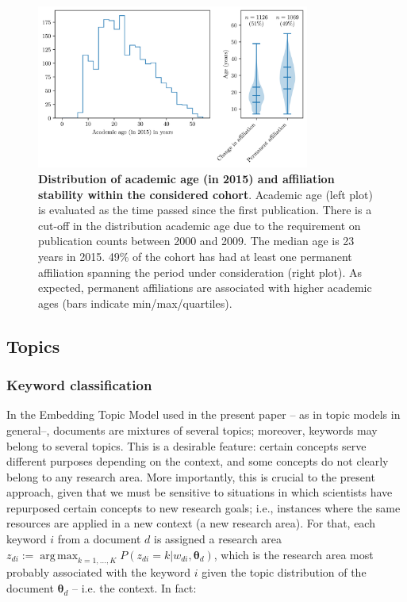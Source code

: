 \documentclass{article}
\DeclareMathOperator*{\argmax}{arg\,max}
\begin{document}
\begin{figure}[H]
    \centering
    \includegraphics[width=0.8\textwidth]{plots/sample_characteristics.png}
    \caption{\textbf{Distribution of academic age (in 2015) and affiliation stability within the considered cohort}.  Academic age (left plot) is evaluated as the time passed since the first publication. There is a cut-off in the distribution academic age due to the requirement on publication counts between 2000 and 2009. The median age is 23 years in 2015. 49\% of the cohort has had at least one permanent affiliation spanning the period under consideration (right plot). As expected, permanent affiliations are associated with higher academic ages (bars indicate min/max/quartiles). }
    \label{fig:sample_characteristics}
\end{figure}

\subsection{\label{appendix:topics}Topics}

\subsubsection{\label{appendix:keywords}Keyword classification}

In the Embedding Topic Model used in the present paper -- as in topic models in general--, documents are mixtures of several topics; moreover, keywords may belong to several topics. This is a desirable feature: certain concepts serve different purposes depending on the context, and some concepts do not clearly belong to any research area. More importantly, this is crucial to the present approach, given that we must be sensitive to situations in which scientists have repurposed certain concepts to new research goals; i.e., instances where the same resources are applied in a new context (a new research area).
For that, each keyword $i$ from a document $d$ is assigned a research area $z_{di} := \argmax_{k=1,\dots,K} P(z_{di}=k|w_{di},\bm{\theta}_{d})$, which is the research area most probably associated with the keyword $i$ given the topic distribution of the document $\bm{\theta}_d$ -- i.e. the context. In fact:
\end{document}

